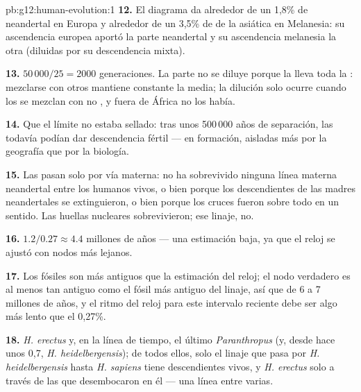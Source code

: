 \begin{solution}{pb:g12:human-evolution:1}
\textbf{12.} El diagrama da alrededor de un 1,8\% de neandertal en
Europa y alrededor de un 3,5\% de  de la  asiática en
Melanesia: su ascendencia europea aportó la parte neandertal y su
ascendencia melanesia la otra (diluidas por su descendencia mixta).

\textbf{13.} $50\,000/25 = 2000$ generaciones. La parte no se diluye
porque la lleva toda la : mezclarse con otros 
mantiene constante la media; la dilución solo ocurre cuando los
 se mezclan con no , y fuera de África no los
había.

\textbf{14.} Que el límite no estaba sellado: tras unos 500\,000 años
de separación, las  todavía podían dar descendencia fértil
---  en formación, aisladas más por la geografía que por la
biología.

\textbf{15.} Las  pasan solo por vía materna: no ha
sobrevivido ninguna línea materna neandertal entre los humanos vivos,
o bien porque los descendientes de las madres neandertales se
extinguieron, o bien porque los cruces fueron sobre todo en un
sentido. Las huellas nucleares sobrevivieron; ese linaje, no.

\textbf{16.} $1.2/0.27 \approx 4.4$ millones de años --- una
estimación baja, ya que el reloj se ajustó con nodos más lejanos.

\textbf{17.} Los fósiles son más antiguos que la estimación del reloj;
el nodo verdadero es al menos tan antiguo como el fósil más antiguo del
linaje, así que de 6 a 7 millones de años, y el ritmo del reloj para
este intervalo reciente debe ser algo más lento que el 0,27\%.

\textbf{18.} \emph{H. erectus} y, en la línea de tiempo, el último
\emph{Paranthropus} (y, desde hace unos 0,7, \emph{H. heidelbergensis});
de todos ellos, solo el linaje que pasa por \emph{H. heidelbergensis}
hasta \emph{H. sapiens} tiene descendientes vivos, y \emph{H. erectus}
solo a través de las  que desembocaron en él --- una línea
entre varias.


\end{solution}

